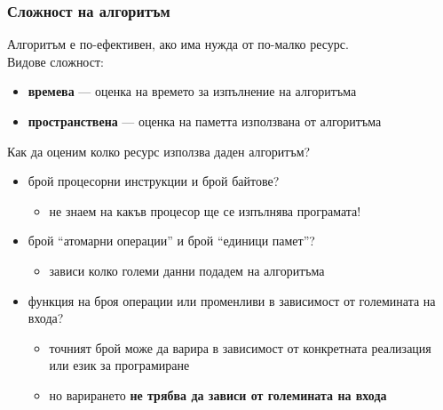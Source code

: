 \documentclass{beamer}
\begin{document}
\begin{frame}
  \frametitle{Сложност на алгоритъм}

  Алгоритъм е по-ефективен, ако има нужда от по-малко ресурс.\\
  \pause
  Видове сложност:
  \begin{itemize}[<+->]
  \item \textbf{времева} --- оценка на времето за изпълнение на алгоритъма
  \item \textbf{пространствена} --- оценка на паметта използвана от алгоритъма
  \end{itemize}
  \onslide<+->
  \vspace{1em}
  Как да оценим колко ресурс използва даден алгоритъм?\\[1em]
  \begin{itemize}[<+->]
  \item брой процесорни инструкции и брой байтове?
    \begin{itemize}
    \item не знаем на какъв процесор ще се изпълнява програмата!
    \end{itemize}
  \item брой ``атомарни операции'' и брой ``единици памет''?
    \begin{itemize}
    \item зависи колко големи данни подадем на алгоритъма
    \end{itemize}
  \item функция на броя операции или променливи в зависимост от големината на входа?
    \begin{itemize}
    \item точният брой може да варира в зависимост от конкретната реализация или език за програмиране
    \item но варирането \textbf{не трябва да зависи от големината на входа}
    \end{itemize}
  \end{itemize}
\end{frame}
\end{document}
